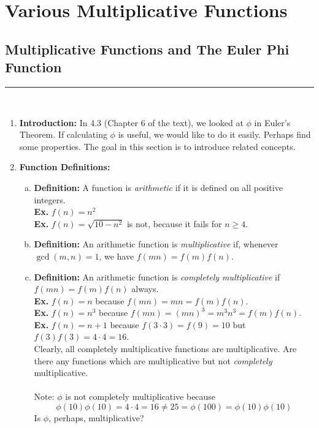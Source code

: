 \documentclass[class=article, crop=false]{standalone}
\begin{document}
\setcounter{section}{6}
\section{Various Multiplicative Functions}

\subsection{Multiplicative Functions and The Euler Phi Function}
\rule{\textwidth}{1pt}\\
\begin{enumerate}
\item \textbf{Introduction:}
In 4.3 (Chapter 6 of the text), we looked at $\phi$ in Euler's Theorem.
If calculating $\phi$ is useful, we would like to do it easily. Perhaps
find some properties. The goal in this section is to introduce related concepts.

\item \textbf{Function Definitions:}
\begin{enumerate}[(a)]
	\item \textbf{Definition:}
	A function is \emph{arithmetic} if it is defined on all positive integers.\\
	\textbf{Ex.} $f(n) = n^2$\\
	\textbf{Ex.} $f(n) = \sqrt{10-n^2}$ is not, because it fails for $n\geq 4$.

	\item \textbf{Definition:}
	An arithmetic function is \emph{multiplicative} if, whenever $\gcd(m,n)=1$,
	we have $f(mn)= f(m)f(n)$.

	\item \textbf{Definition:}
	An arithmetic function is \emph{completely multiplicative} if
	$f(mn) = f(m)f(n)$ always. \\
	\textbf{Ex.} $f(n)=n$ because $f(mn) = mn = f(m)f(n)$. \\
	\textbf{Ex.} $f(n)=n^3$ because $f(mn) = (mn)^3 = m^3 n^3 = f(m) f(n)$. \\
	\textbf{Ex.} $f(n)=n+1$ because $f(3\cdot 3)=f(9)=10$ but $f(3)f(3)=4\cdot4=16$. \\
	Clearly, all completely multiplicative functions are multiplicative. Are there any functions which are
	multiplicative but not \emph{completely} multiplicative.\\\\
	Note: $\phi$ is not completely multiplicative because 
	$$\phi(10)\phi(10)=4\cdot 4= 16\neq 25=\phi(100) = \phi(10)\phi(10)$$
	Is $\phi$, perhaps, multiplicative?
	

\end{enumerate}
\end{enumerate}
\end{document}
